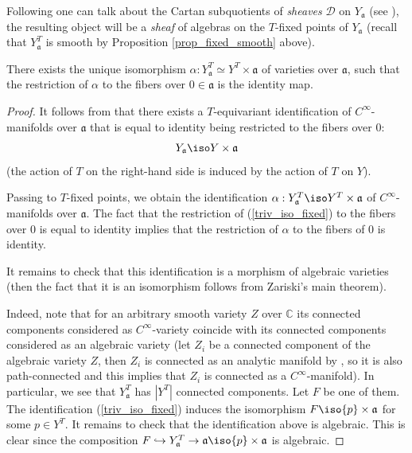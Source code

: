 \documentclass[12pt]{amsart}
\begin{document}
Following \cite[Section 5.2]{LosevCatO} one can talk about the Cartan subquotients of  {\emph{sheaves}} $\mathcal{D}$ on $Y_{\mathfrak{a}}$ (see  \cite[Proposition 5.2]{LosevCatO}), the resulting object will be a {\emph{sheaf}} of algebras on the $T$-fixed points of $Y_{\mathfrak{a}}$ (recall that $Y_{\mathfrak{a}}^T$ is smooth by Proposition \ref{prop_fixed_smooth} above).


\begin{lemma}\label{fixed_pts_deform}
There exists the unique isomorphism $\alpha: Y_{\mathfrak{a}}^{T} \simeq Y^{T} \times \mathfrak{a}$ of varieties over $\mathfrak{a}$, such that the restriction of $\alpha$ to the fibers over $0 \in \mathfrak{a}$ is the identity map.
\end{lemma}
\begin{proof}
It follows from  \cite[Section 1.2 and references therein]{Namikawa2} that there exists a $T$-equivariant identification of  $C^\infty$-manifolds over $\mathfrak{a}$ that is equal to identity being restricted to the fibers over $0$: 
\begin{equation}\label{triv_iso_fixed}
Y_{\mathfrak{a}} \iso Y \times \mathfrak{a}
\end{equation}
(the action of $T$ on the right-hand side is induced by the action of $T$ on $Y$). 

Passing to $T$-fixed points, we obtain the identification $\alpha: Y_{\mathfrak{a}}^T \iso Y^T \times \mathfrak{a}$ of $C^\infty$-manifolds over $\mathfrak{a}$. The fact that the restriction of (\ref{triv_iso_fixed}) to the fibers over $0$ is equal to identity implies that the restriction of $\alpha$ to the fibers of $0$ is identity.

It remains to check that this identification is a morphism of algebraic varieties (then the fact that it is an isomorphism follows from Zariski's main theorem). 

Indeed, note that for an arbitrary smooth variety $Z$ over $\mathbb{C}$ its connected components considered as $C^\infty$-variety coincide with its connected components considered as an algebraic variety (let $Z_i$ be a connected component of the algebraic variety $Z$, then $Z_i$ is connected as an analytic manifold by \cite[Chapter VII, § 2.2, Theorem 1]{shafarevich2}, so it is also path-connected and this implies that $Z_i$ is connected as a $C^\infty$-manifold). In particular, we see that $Y_{\mathfrak{a}}^T$ has $|Y^T|$ connected components. Let $F$ be one of them. The identification (\ref{triv_iso_fixed}) induces the isomorphism  $F \iso \{p\} \times \mathfrak{a}$ for some $p \in Y^T$. It remains to check that the identification above is algebraic. This is clear since the composition $F \hookrightarrow Y_{\mathfrak{a}}^T \rightarrow {\mathfrak{a}} \iso \{p\} \times \mathfrak{a}$ is algebraic. 



\end{proof}
\end{document}
